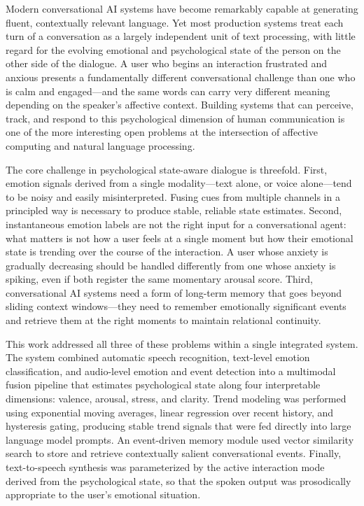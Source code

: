 \documentclass[conference]{IEEEtran}
\begin{document}
Modern conversational AI systems have become remarkably capable at generating fluent, contextually relevant language. Yet most production systems treat each turn of a conversation as a largely independent unit of text processing, with little regard for the evolving emotional and psychological state of the person on the other side of the dialogue. A user who begins an interaction frustrated and anxious presents a fundamentally different conversational challenge than one who is calm and engaged---and the same words can carry very different meaning depending on the speaker's affective context. Building systems that can perceive, track, and respond to this psychological dimension of human communication is one of the more interesting open problems at the intersection of affective computing and natural language processing.

The core challenge in psychological state-aware dialogue is threefold. First, emotion signals derived from a single modality---text alone, or voice alone---tend to be noisy and easily misinterpreted. Fusing cues from multiple channels in a principled way is necessary to produce stable, reliable state estimates. Second, instantaneous emotion labels are not the right input for a conversational agent: what matters is not how a user feels at a single moment but how their emotional state is trending over the course of the interaction. A user whose anxiety is gradually decreasing should be handled differently from one whose anxiety is spiking, even if both register the same momentary arousal score. Third, conversational AI systems need a form of long-term memory that goes beyond sliding context windows---they need to remember emotionally significant events and retrieve them at the right moments to maintain relational continuity.

This work addressed all three of these problems within a single integrated system. The system combined automatic speech recognition, text-level emotion classification, and audio-level emotion and event detection into a multimodal fusion pipeline that estimates psychological state along four interpretable dimensions: valence, arousal, stress, and clarity. Trend modeling was performed using exponential moving averages, linear regression over recent history, and hysteresis gating, producing stable trend signals that were fed directly into large language model prompts. An event-driven memory module used vector similarity search to store and retrieve contextually salient conversational events. Finally, text-to-speech synthesis was parameterized by the active interaction mode derived from the psychological state, so that the spoken output was prosodically appropriate to the user's emotional situation.
\end{document}
